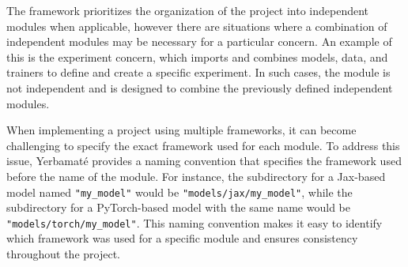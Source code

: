 The framework prioritizes the organization of the project into independent modules when applicable, however there are situations where a combination of independent modules may be necessary for a particular concern. An example of this is the experiment concern, which imports and combines models, data, and trainers to define and create a specific experiment. In such cases, the module is not independent and is designed to combine the previously defined independent modules. 

When implementing a project using multiple frameworks, it can become challenging to specify the exact framework used for each module. To address this issue, Yerbamaté provides a naming convention that specifies the framework used before the name of the module. For instance, the subdirectory for a Jax-based model named \texttt{"my\_model"} would be \texttt{"models/jax/my\_model"}, while the subdirectory for a PyTorch-based model with the same name would be \texttt{"models/torch/my\_model"}. This naming convention makes it easy to identify which framework was used for a specific module and ensures consistency throughout the project.








